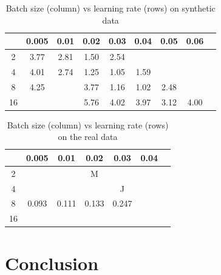 \documentclass[10pt,conference]{IEEEtran}
\begin{document}
\begin{table}
    \centering
    \begin{tabular}{|c || c | c | c | c | c | c| c | c |} 
        \hline
          & 0.005 & 0.01 & 0.02 & 0.03 & 0.04 & 0.05 & 0.06 \\  
        \hline\hline
        2 & 3.77  & 2.81 & 1.50 & 2.54 &      &      &\\ 
        \hline
        4 & 4.01  & 2.74 & 1.25 & 1.05 & 1.59 &      &\\
        \hline
        8 & 4.25  &      & 3.77 & 1.16 & 1.02 & 2.48 &\\
        \hline
        16 &      &      & 5.76 & 4.02 & 3.97 & 3.12 & 4.00\\
        \hline
    \end{tabular}
    \caption{Batch size (column) vs learning rate (rows) on synthetic data}
\label{table:syntheticDataResults}
\end{table}

\begin{table}
    \centering
     \begin{tabular}{|c || c | c | c | c | c | c| } 
     \hline
        & 0.005 & 0.01 & 0.02 & 0.03 & 0.04 \\  
     \hline\hline
     2  &       &      &   M   &      &  \\ 
     \hline
     4  &       &      &      &   J  &  \\
     \hline
     8  &  0.093& 0.111& 0.133& 0.247&  \\
     \hline
     16 &       &      &      &      &  \\
     \hline
    \end{tabular}
    \caption{Batch size (column) vs learning rate (rows) on the real data}
\label{table:realDataResults}
\end{table}


\section{Conclusion}



\end{document}
